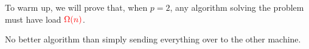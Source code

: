 \documentclass{beamer}
\def\vgap{\vspace{5mm}}
\begin{document}
\begin{frame}
\begin{small}
    
    \vgap 
    
    To warm up, we will prove that, when $p = 2$, any algorithm solving the problem must have load $\textcolor{red}{\Omega(n)}$. 
    
    \vgap
    
     No better algorithm than simply sending everything over to the other machine.  
    
    
    
\end{small}
\end{frame}
%     
%     
%     
%     
%     
\end{document}
